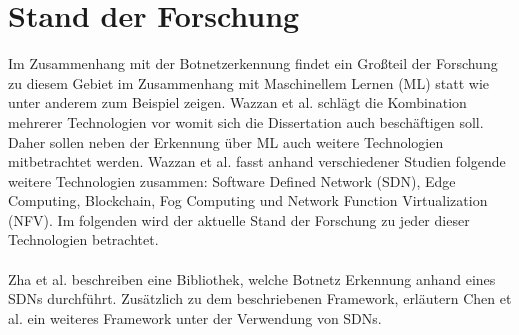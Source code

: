 \section{Stand der Forschung}
\label{sec:research}

Im Zusammenhang mit der Botnetzerkennung findet ein Großteil der Forschung zu diesem Gebiet im Zusammenhang mit Maschinellem Lernen (ML) statt wie
unter anderem zum Beispiel \cite{SAlrayes2022ModelingOB,DBLP:journals/comcom/Alani22,Habtamu2022ASR} zeigen.
Wazzan et al. \cite{Wazzan2021InternetOT} schlägt die Kombination mehrerer Technologien vor womit sich die Dissertation auch beschäftigen soll.
Daher sollen neben der Erkennung über ML auch weitere Technologien mitbetrachtet werden. Wazzan et al. fasst anhand verschiedener Studien folgende 
weitere Technologien zusammen: Software Defined Network (SDN), Edge Computing, Blockchain, Fog Computing und Network Function Virtualization (NFV). 
Im folgenden wird der aktuelle Stand der Forschung zu jeder dieser Technologien betrachtet. \\ \\ Zha et al. \cite{DBLP:conf/cns/Zha0GMC19} beschreiben 
eine Bibliothek, welche Botnetz Erkennung anhand eines SDNs durchführt. Zusätzlich zu dem beschriebenen Framework, erläutern Chen et al. \cite{Chen2017BotGuardLR}
ein weiteres Framework unter der Verwendung von SDNs.
